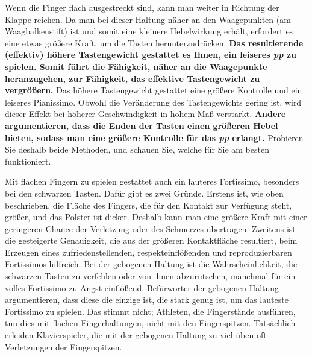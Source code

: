 Wenn die Finger flach ausgestreckt sind, kann man weiter in Richtung der Klappe reichen.
Da man bei dieser Haltung näher an den Waagepunkten (am Waagbalkenstift) ist und somit eine kleinere Hebelwirkung erhält, erfordert es eine etwas größere Kraft, um die Tasten herunterzudrücken.
\textbf{Das resultierende (effektiv) höhere Tastengewicht gestattet es Ihnen, ein leiseres \textit{pp} zu spielen.
Somit führt die Fähigkeit, näher an die Waagepunkte heranzugehen, zur Fähigkeit, das effektive Tastengewicht zu vergrößern.}
Das höhere Tastengewicht gestattet eine größere Kontrolle und ein leiseres Pianissimo.
Obwohl die Veränderung des Tastengewichts gering ist, wird dieser Effekt bei höherer Geschwindigkeit in hohem Maß verstärkt.
\textbf{Andere argumentieren, dass die Enden der Tasten einen größeren Hebel bieten, sodass man eine größere Kontrolle für das \textit{pp} erlangt.}
Probieren Sie deshalb beide Methoden, und schauen Sie, welche für Sie am besten funktioniert. 

Mit flachen Fingern zu spielen gestattet auch ein lauteres Fortissimo, besonders bei den schwarzen Tasten.
Dafür gibt es zwei Gründe.
Erstens ist, wie oben beschrieben, die Fläche des Fingers, die für den Kontakt zur Verfügung steht, größer, und das Polster ist dicker.
Deshalb kann man eine größere Kraft mit einer geringeren Chance der Verletzung oder des Schmerzes übertragen.
Zweitens ist die gesteigerte Genauigkeit, die aus der größeren Kontaktfläche resultiert, beim Erzeugen eines zufriedenstellenden, respekteinflößenden und reproduzierbaren Fortissimos hilfreich.
Bei der gebogenen Haltung ist die Wahrscheinlichkeit, die schwarzen Tasten zu verfehlen oder von ihnen abzurutschen, manchmal für ein volles Fortissimo zu Angst einflößend.
Befürworter der gebogenen Haltung argumentieren, dass diese die einzige ist, die stark genug ist, um das lauteste Fortissimo zu spielen.
Das stimmt nicht; Athleten, die Fingerstände ausführen, tun dies mit flachen Fingerhaltungen, nicht mit den Fingerspitzen.
Tatsächlich erleiden Klavierspieler, die mit der gebogenen Haltung zu viel üben oft Verletzungen der Fingerspitzen.

